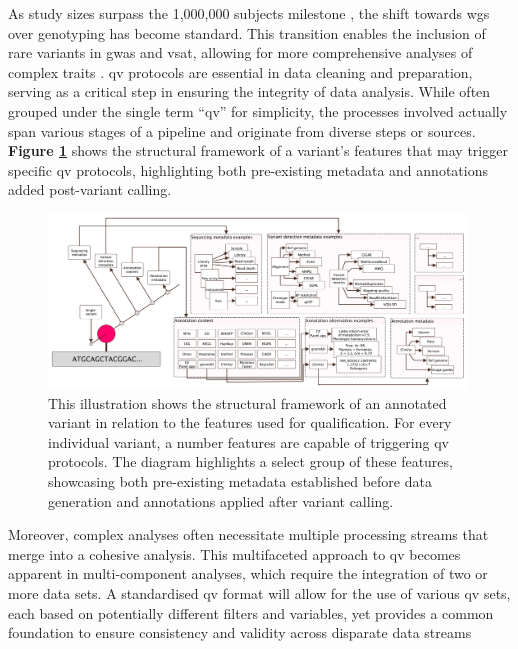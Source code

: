 As study sizes surpass the 1,000,000 subjects milestone \cite{lee2018gene, jansen2019genome}, the shift towards \ac{wgs} over genotyping has become standard. 
This transition enables the inclusion of rare variants in \ac{gwas} and \ac{vsat}, allowing for more comprehensive analyses of complex traits \cite{manolio2009finding, young2019solving}. %
\ac{qv} protocols are essential in data cleaning and preparation, serving as a critical step in ensuring the integrity of data analysis. 
While often grouped under the single term ``\ac{qv}'' for simplicity, the processes involved actually span various stages of a pipeline and originate from diverse steps or sources.
\textbf{Figure 
\ref{fig:qv_structure_vcurrent}}
shows the structural framework of a variant's features that may trigger specific \ac{qv} protocols, highlighting both pre-existing metadata and annotations added post-variant calling.

\begin{figure}[h!]
\centering
     \includegraphics[width=0.99\textwidth]{./images/qv_structure_vcurrent.pdf}
\caption{This illustration shows the structural framework of an annotated variant in relation to the features used for qualification. For every individual variant, a number features are capable of triggering \ac{qv} protocols. The diagram highlights a select group of these features, showcasing both pre-existing metadata established before data generation and annotations applied after variant calling.}
\label{fig:qv_structure_vcurrent}
\end{figure}

Moreover, complex analyses often necessitate multiple processing streams that merge into a cohesive analysis. 
This multifaceted approach to \ac{qv} becomes apparent in multi-component analyses, which require the integration of two or more data sets. 
A standardised \ac{qv} format will allow for the use of various \ac{qv} sets, each based on potentially different filters and variables, yet provides a common foundation to ensure consistency and validity across disparate data streams

